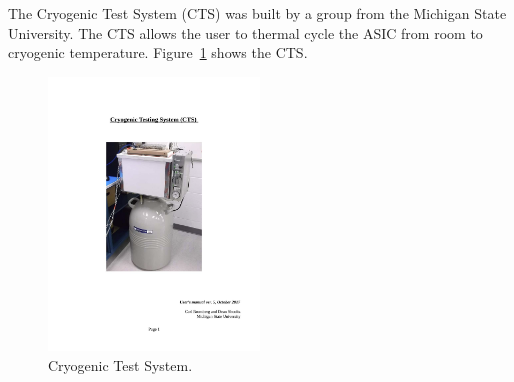 \label{sec:2.1}


The Cryogenic Test System (CTS) was built by a group from the Michigan State University. The CTS allows the user to thermal cycle the ASIC from room to cryogenic temperature. Figure~\ref{fig:cts} shows the CTS.
\begin{figure}[htb]
\centering
\begin{center}
\includegraphics[width=0.5\textwidth]{figures/CTS.pdf}
\end{center}
\caption{Cryogenic Test System.}
\label{fig:cts}
\end{figure}

